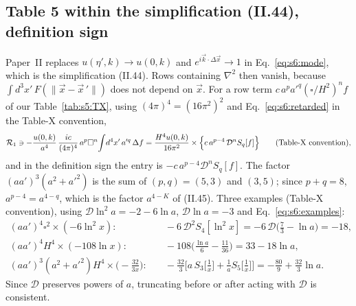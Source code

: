 \documentclass[aps,prd,onecolumn,10pt,nofootinbib,floatfix]{revtex4-2}
\newcommand{\PII}{Paper~II}
\newcommand{\eqII}[1]{(II.#1)}
\newcommand{\Dop}{\mathcal{D}}
\begin{document}
\subsection{Table 5 within the simplification (II.44), definition sign}
\label{sec:s6:tab5}

\PII{} replaces $u(\eta',k)\to u(0,k)$ and $e^{i\vec k\cdot\Delta\vec x}\to1$ in Eq.~\eqref{eq:s6:mode}, which is the
simplification \eqII{44}. Rows containing $\nabla^2$ then vanish, because $\int d^3x'\,F(\|\vec x-\vec x\,'\|)$ does
not depend on $\vec x$. For a row term $c\,a^pa'^q(\square/H^2)^n f$ of our Table~\ref{tab:s5:TX}, using
$(4\pi)^4=(16\pi^2)^2$ and Eq.~\eqref{eq:s6:retarded} in the Table-X convention,
\begin{equation}
\sixR_1\ni-\frac{u(0,k)}{a^4}\,\frac{ic}{(4\pi)^4}\,a^p\square^n\!\int\!d^4x'\,a'^q\,\Delta f
=\sixunit\times\Big\{c\,a^{p-4}\,\Dop^nS_q[f]\Big\}\qquad(\text{Table-X convention}),
\label{eq:s6:rule}
\end{equation}
and in the definition sign the entry is $-c\,a^{p-4}\Dop^nS_q[f]$. The factor $(aa')^3(a^2+a'^2)$ is the sum of
$(p,q)=(5,3)$ and $(3,5)$; since $p+q=8$, $a^{p-4}=a^{4-q}$, which is the factor $a^{4-K}$ of \eqII{45}. Three examples
(Table-X convention), using $\Dop\ln^2a=-2-6\ln a$, $\Dop\ln a=-3$ and Eq.~\eqref{eq:s6:examples}:
\begin{equation}
\begin{aligned}
(aa')^4\square^2\times(-6\ln^2x):&\quad -6\,\Dop^2S_4[\ln^2x]=-6\,\Dop\Big(\frac73-\ln a\Big)=-18,\\
(aa')^4H^4\times(-108\ln x):&\quad -108\Big(\frac{\ln a}6-\frac{11}{36}\Big)=33-18\ln a,\\
(aa')^3(a^2+a'^2)H^4\times\Big(-\frac{32}{3x}\Big):&\quad
-\frac{32}3\Big[a\,S_3\Big[\frac1x\Big]+\frac1aS_5\Big[\frac1x\Big]\Big]=-\frac{80}9+\frac{32}3\ln a .
\end{aligned}
\label{eq:s6:t5ex}
\end{equation}
Since $\Dop$ preserves powers of $a$, truncating before or after acting with $\Dop$ is consistent.
\end{document}
